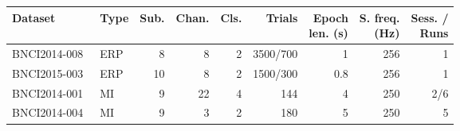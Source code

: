 \sffamily
\small
\begin{tabularx}{\textwidth}{@{}lXrrrrrrr@{}}
  \toprule
  Dataset & Type & Sub. & Chan. & Cls. & Trials &
  \makecell{Epoch \\ len. (s)} & \makecell{S. freq. \\ (Hz)} & \makecell{Sess. / \\ Runs} \\
  \midrule
  BNCI2014-008~\cite{Riccio2013}  & ERP & 8  & 8  & 2  & 3500/700 & 1   & 256 & 1 \\
  BNCI2015-003~\cite{Guger2009}   & ERP & 10 & 8  & 2  & 1500/300 & 0.8 & 256 & 1 \\
  \midrule
  BNCI2014-001~\cite{Tangermann2012} & MI  & 9  & 22 & 4  & 144     & 4   & 250 & 2/6 \\
  BNCI2014-004~\cite{Leeb2007}       & MI  & 9  & 3  & 2  & 180     & 5   & 250 & 5 \\
  \bottomrule
\end{tabularx}
